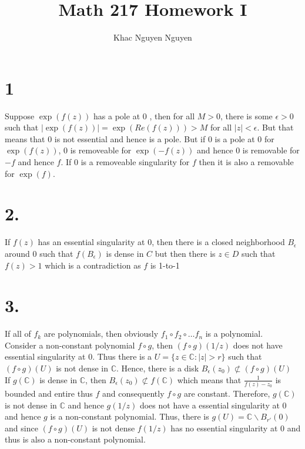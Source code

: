 \documentclass[11pt]{article}
\title{\textbf{Math 217 Homework I}}
\author{Khac Nguyen Nguyen}
\date{}
\begin{document}
\section*{1}
Suppose $\exp(f(z))$ has a pole at 0 , then for all $M > 0$, there is some $\epsilon>0$ such that $|\exp(f(z))| = \exp(Re(f(z)))> M$ for all $|z|<\epsilon$. 
But that means that $0$ is not essential and hence is a pole. But if $0$ is a pole at 0 for $\exp(f(z))$, $0$ is removeable for $\exp(-f(z))$ and hence $0$ is removable for $-f$ and hence $f$. 
If $0$ is a removeable singularity for $f$ then it is also a removable for $\exp(f)$.
\newpage
\section*{2.}
If $f(z)$ has an essential singularity at $0$, then there is a closed neighborhood $B_\epsilon$ around 0  such that $f(B_\epsilon)$ is dense in $C$ but then there is $z \in D$ such that $f(z) > 1$ which is a contradiction as $f$ is 1-to-1
\newpage
\section*{3.}
If all of $f_k$ are polynomials, then obviously $f_1 \circ f_2 \circ \hdots f_n$ is a polynomial. \\ 
Consider a non-constant polynomial $f\circ g$, then $(f \circ g)(1/z)$ does not have essential singularity at 0.
Thus there is a $U = \{z \in \mathbb{C}: |z| > r\}$ such that $(f \circ g)(U)$ is not dense in $\mathbb{C}$. 
Hence, there is a disk $B_{\epsilon}(z_0) \not\subset (f\circ g)(U)$\\
If $g(\mathbb{C})$ is dense in $\mathbb{C}$, then $B_\epsilon(z_0) \not\subset f(\mathbb{C})$ 
which means that $\frac{1}{f(z) -z_0}$ is bounded and entire thus $f$ and consequently $f \circ g$ are constant. 
Therefore, $g(\mathbb{C})$ is not dense in $\mathbb{C}$ and hence $g(1/z)$ does not have a essential singularity at 0 
and hence $g$ is a non-constant polynomial. Thus, there is $g(U) =  \mathbb{C} \backslash B_{r'}(0)$ and since $(f\circ g)(U)$ is not dense 
$f(1/z)$ has no essential singularity at $0$ and thus is also a non-constant polynomial.
\newpage
\end{document}
